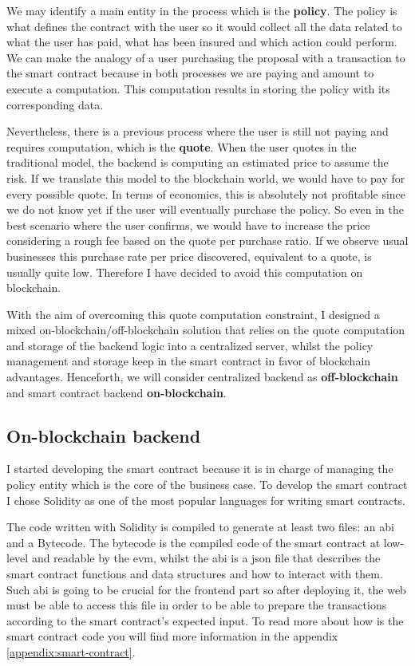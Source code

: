 {
We may identify a main entity in the process which is the \textbf{policy}. The policy is what defines the contract with the user so it would collect all the data related to what the user has paid, what has been insured and which action could perform. We can make the analogy of a user purchasing the proposal with a transaction to the smart contract because in both processes we are paying and amount to execute a computation. This computation results in storing the policy with its corresponding data. 

Nevertheless, there is a previous process where the user is still not paying and requires computation, which is the \textbf{quote}. When the user quotes in the traditional model, the backend is computing an estimated price to assume the risk. If we translate this model to the blockchain world, we would have to pay for every possible quote. In terms of economics, this is absolutely not profitable since we do not know yet if the user will eventually purchase the policy. So even in the best scenario where the user confirms, we would have to increase the price considering a rough fee based on the quote per purchase ratio. If we observe usual businesses this purchase rate per price discovered, equivalent to a quote, is usually quite low. Therefore I have decided to avoid this computation on blockchain.

With the aim of overcoming this quote computation constraint, I designed a mixed on-blockchain/off-blockchain solution that relies on the quote computation and storage of the backend logic into a centralized server, whilst the policy management and storage keep in the smart contract in favor of blockchain advantages. Henceforth, we will consider centralized backend as \textbf{off-blockchain} and smart contract backend \textbf{on-blockchain}.
}

\subsection{On-blockchain backend}
{
I started developing the smart contract because it is in charge of managing the policy entity which is the core of the business case. To develop the smart contract I chose Solidity\cite{solidity} as one of the most popular languages for writing smart contracts. 

The code written with Solidity is compiled to generate at least two files: an \acrfull{abi} and a Bytecode. The bytecode is the compiled code of the smart contract at low-level and readable by the \acrshort{evm}, whilst the \acrshort{abi} is a \Gls{json} file that describes the smart contract functions and data structures and how to interact with them. Such \acrshort{abi} is going to be crucial for the frontend part so after deploying it, the web must be able to access this file in order to be able to prepare the transactions according to the smart contract's expected input. To read more about how is the smart contract code you will find more information in the appendix \ref{appendix:smart-contract}.
}
